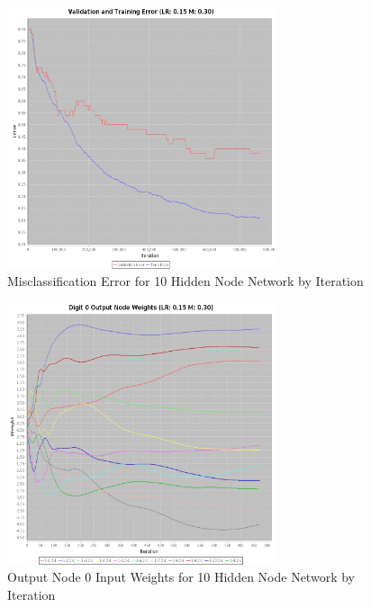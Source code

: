 \documentclass{article}
\begin{document}
\begin{figure}
\centering
\includegraphics[width=0.7\textwidth]{data/final/10_hidden_nodes_error.png}
\caption{Misclassification Error for 10 Hidden Node Network by Iteration}
\label{error10}
\end{figure}

\begin{figure}
\centering
\includegraphics[width=0.7\textwidth]{data/final/10_hidden_nodes.png}
\caption{Output Node 0 Input Weights for 10 Hidden Node Network by Iteration}
\label{weight10}
\end{figure}
\end{document}
